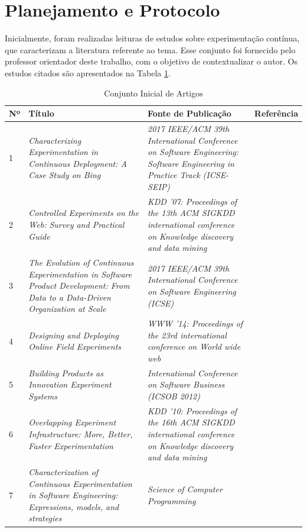 \section{Planejamento e Protocolo}
\label{sec:rsl-protocolo}

Inicialmente, foram realizadas leituras de estudos sobre experimentação contínua, que caracterizam a literatura referente ao tema. Esse conjunto foi fornecido pelo professor orientador deste trabalho, com o objetivo de contextualizar o autor. Os estudos citados são apresentados na Tabela \ref{tab:conjunto-inicial}.

\begin{table}[ht]
\centering
\caption{Conjunto Inicial de Artigos}
    \begin{tabular}{|p{.5cm}|p{6cm}|p{6cm}|p{1.75cm}|}
        \hline
        Nº & Título & Fonte de Publicação & Referência \\ \hline
        1 & \textit{Characterizing Experimentation in Continuous Deployment: A Case Study on Bing} & \textit{2017 IEEE/ACM 39th International Conference on Software Engineering: Software Engineering in Practice Track (ICSE-SEIP)} & \cite{kevic_characterizing_2017} \\ \hline
        2 & \textit{Controlled Experiments on the Web: Survey and Practical Guide} & \textit{KDD '07: Proceedings of the 13th ACM SIGKDD international conference on Knowledge discovery and data mining} & \cite{kohavi_controlled_2009} \\  \hline
        3 & \textit{The Evolution of Continuous Experimentation in Software Product Development: From Data to a Data-Driven Organization at Scale} & \textit{2017 IEEE/ACM 39th International Conference on Software Engineering (ICSE)} & \cite{fabijan_evolution_2017} \\ \hline
        4 & \textit{Designing and Deploying Online Field Experiments} & \textit{WWW '14: Proceedings of the 23rd international conference on World wide web} & \cite{bakshy_designing_2014} \\ \hline
        5 & \textit{Building Products as Innovation Experiment Systems} & \textit{International Conference on Software Business (ICSOB 2012)} & \cite{van_der_aalst_building_2012} \\ \hline
        6 & \textit{Overlapping Experiment Infrastructure: More, Better, Faster Experimentation} & \textit{KDD '10: Proceedings of the 16th ACM SIGKDD international conference on Knowledge discovery and data mining} & \cite{tang_overlapping_2010} \\ \hline
        7 & \textit{Characterization of Continuous Experimentation in Software Engineering: Expressions, models, and strategies} & \textit{Science of Computer Programming} & \cite{erthal_characterization_2023} \\ \hline
    \end{tabular}

    \begin{center}
        
    \end{center}

\label{tab:conjunto-inicial}
\end{table}   

